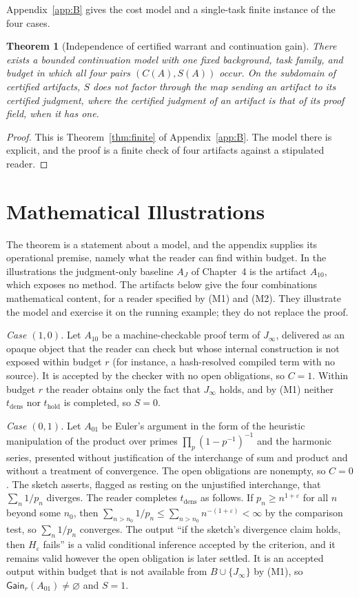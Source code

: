\documentclass[11pt]{book}
\newtheorem{theorem}{Theorem}[chapter]
\theoremstyle{definition}
\theoremstyle{remark}
\newcommand{\Gain}{\mathsf{Gain}}
\begin{document}
Appendix~\ref{app:B} gives the cost model and a single-task finite instance of the four cases.


\begin{theorem}[Independence of certified warrant and continuation gain]\label{thm:indep}
There exists a bounded continuation model with one fixed background, task family, and budget in which all four pairs $(C(A),S(A))$ occur. On the subdomain of certified artifacts, $S$ does not factor through the map sending an artifact to its certified judgment, where the certified judgment of an artifact is that of its proof field, when it has one.
\end{theorem}

\begin{proof}
This is Theorem~\ref{thm:finite} of Appendix~\ref{app:B}. The model there is explicit, and the proof is a finite check of four artifacts against a stipulated reader.
\end{proof}

\section{Mathematical Illustrations}

The theorem is a statement about a model, and the appendix supplies its operational premise, namely what the reader can find within budget. In the illustrations the judgment-only baseline $A_J$ of Chapter~4 is the artifact $A_{10}$, which exposes no method. The artifacts below give the four combinations mathematical content, for a reader specified by (M1) and (M2). They illustrate the model and exercise it on the running example; they do not replace the proof.

\emph{Case $(1,0)$.} Let $A_{10}$ be a machine-checkable proof term of $J_\infty$, delivered as an opaque object that the reader can check but whose internal construction is not exposed within budget $r$ (for instance, a hash-resolved compiled term with no source). It is accepted by the checker with no open obligations, so $C=1$. Within budget $r$ the reader obtains only the fact that $J_\infty$ holds, and by (M1) neither $t_{\mathrm{dens}}$ nor $t_{\mathrm{hold}}$ is completed, so $S=0$.

\emph{Case $(0,1)$.} Let $A_{01}$ be Euler's argument in the form of the heuristic manipulation of the product over primes $\prod_p(1-p^{-1})^{-1}$ and the harmonic series, presented without justification of the interchange of sum and product and without a treatment of convergence. The open obligations are nonempty, so $C=0$. The sketch asserts, flagged as resting on the unjustified interchange, that $\sum_n 1/p_n$ diverges. The reader completes $t_{\mathrm{dens}}$ as follows. If $p_n\ge n^{1+\varepsilon}$ for all $n$ beyond some $n_0$, then $\sum_{n>n_0}1/p_n\le\sum_{n>n_0}n^{-(1+\varepsilon)}<\infty$ by the comparison test, so $\sum_n 1/p_n$ converges. The output ``if the sketch's divergence claim holds, then $H_\varepsilon$ fails'' is a valid conditional inference accepted by the criterion, and it remains valid however the open obligation is later settled. It is an accepted output within budget that is not available from $B\cup\{J_\infty\}$ by (M1), so $\Gain_r(A_{01})\ne\varnothing$ and $S=1$.
\end{document}
